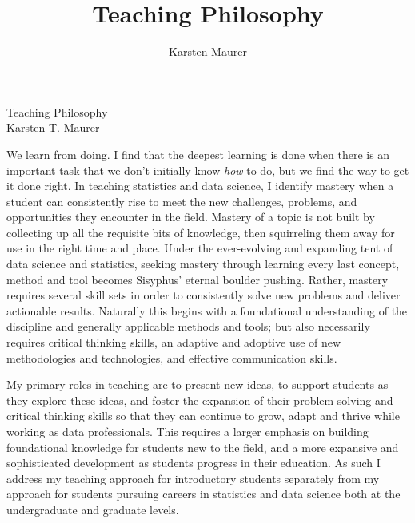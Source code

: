\documentclass[letterpaper,12pt]{article}\usepackage[]{graphicx}\usepackage[]{color}
\title{Teaching Philosophy}
\author{Karsten Maurer}
\date{}
\begin{document}
\onehalfspacing

\begin{center}
\Large Teaching Philosophy \\
\normalsize Karsten T. Maurer \\
\end{center}

\vspace{.1in}

We learn from doing. I find that the deepest learning is done when there is an important task that we don't initially know {\it how} to do, but we find the way to get it done right. In teaching statistics and data science, I identify mastery when a student can consistently rise to meet the new challenges, problems, and opportunities they encounter in the field. Mastery of a topic is not built by collecting up all the requisite bits of knowledge, then squirreling them away for use in the right time and place. Under the ever-evolving and expanding tent of data science and statistics, seeking mastery through learning every last concept, method and tool becomes Sisyphus' eternal boulder pushing. Rather, mastery requires several skill sets in order to consistently solve new problems and deliver actionable results. Naturally this begins with a foundational understanding of the discipline and generally applicable methods and tools; but also necessarily requires critical thinking skills, an adaptive and adoptive use of new methodologies and technologies, and effective communication skills. 

My primary roles in teaching are to present new ideas, to support students as they explore these ideas, and foster the expansion of their problem-solving and critical thinking skills so that they can continue to grow, adapt and thrive while working as data professionals. This requires a larger emphasis on building foundational knowledge for students new to the field, and a more expansive and sophisticated development as students progress in their education. As such I address my teaching approach for introductory students separately from my approach for students pursuing careers in statistics and data science both at the undergraduate and graduate levels. 
\end{document}
